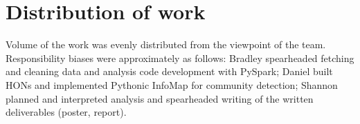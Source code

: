\documentclass[sigconf]{acmart}
\begin{document}
\section{Distribution of work}
Volume of the work was evenly distributed from the viewpoint of the team. Responsibility biases were approximately as follows: Bradley spearheaded fetching and cleaning data and analysis code development with PySpark; Daniel built HONs and implemented Pythonic InfoMap for community detection; Shannon planned and interpreted analysis and spearheaded writing of the written deliverables (poster, report).

\newpage


\end{document}
